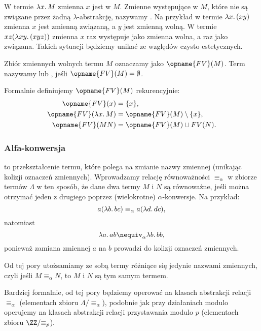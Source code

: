 \documentclass[polish,pretty]{angav}
\newcommand{\FV}{\opname{FV}}
\begin{document}
W termie $\lambda x\ldotp M$ zmienna $x$ jest  w $M$.
Zmienne występujące w $M$, które nie są związane przez żadną $\lambda$-abstrakcję, nazywamy .
Na przykład w termie $\lambda x\ldotp (x y)$ zmienna $x$ jest zmienną związaną, a $y$ jest zmienną wolną.
W termie $xz(\lambda xy\ldotp (xyz))$ zmienna $x$ raz występuje jako zmienna wolna, a raz jako związana. Takich sytuacji będziemy unikać ze względów czysto estetycznych.

Zbiór zmiennych wolnych termu $M$ oznaczamy jako $\FV(M)$.
Term nazywamy  lub , jeśli $\FV(M) = \emptyset$.

\begin{remark}
    Formalnie definiujemy $\FV(M)$ rekurencyjnie:
    \begin{align*}
        \FV(x) &= \{x\}, \\
        \FV(\lambda x\ldotp M) &= \FV(M) \setminus \{x\}, \\
        \FV(MN) &= \FV(M) \cup FV(N).
    \end{align*}
\end{remark}

\subsubsection*{Alfa-konwersja}

 to przekształcenie termu, które polega na zmianie nazwy zmiennej (unikając kolizji oznaczeń zmiennych). Wprowadzamy relację równoważności $\equiv_\alpha$ w zbiorze termów $\Lambda$ w ten sposób, że dane dwa termy $M$ i $N$ są równoważne, jeśli można otrzymać jeden z drugiego poprzez (wielokrotne) $\alpha$-konwersje. Na przykład:
\[ a (\lambda b\ldotp bc) \equiv_\alpha a (\lambda d\ldotp dc), \]
natomiast
\[ \lambda a\ldotp ab \nequiv_\alpha \lambda b\ldotp bb, \]
ponieważ zamiana zmiennej $a$ na $b$ prowadzi do kolizji oznaczeń zmiennych.

Od tej pory utożsamiamy ze sobą termy różniące się jedynie nazwami zmiennych, czyli jeśli $M \equiv_\alpha N$, to $M$ i $N$ są tym samym termem.

\begin{remark}
    Bardziej formalnie, od tej pory będziemy operować na klasach abstrakcji relacji $\equiv_\alpha$ (elementach zbioru $\Lambda/{\equiv_\alpha}$), podobnie jak przy działaniach modulo operujemy na klasach abstrakcji relacji przystawania modulo $p$ (elementach zbioru $\ZZ/{\equiv_p}$).
\end{remark}
\end{document}
